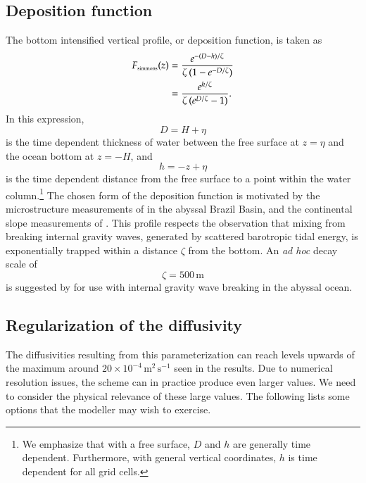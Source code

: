\subsection{Deposition function}

The bottom intensified vertical profile, or deposition function, is
taken as
\begin{equation}
\begin{split}
  F_{\mbox{\tiny simmons}}(z) &= \frac{e^{-(D-h)/\zeta}}{\zeta \, (1 - e^{-D/\zeta} )}
  \\
  &= \frac{e^{h/\zeta}}{\zeta \, (e^{D/\zeta}-1)}.
\end{split}
\label{eq:simmons-vertical-function}
\end{equation}
 In this expression,
\begin{equation}
  D = H + \eta
\end{equation}
is the time dependent thickness of water between the free surface at
$z=\eta$ and the ocean bottom at $z=-H$, and
\begin{equation}
  h=-z+\eta
\end{equation}
is the time dependent distance from the free surface to a point within
the water column.\footnote{We emphasize that with a free surface, $D$
and $h$ are generally time dependent.  Furthermore, with general
vertical coordinates, $h$ is time dependent for all grid cells.}  The
chosen form of the deposition function is motivated by the
microstructure measurements of \cite{StLaurent_etal2001} in the
abyssal Brazil Basin, and the continental slope measurements of
\cite{Moum_etal2002}.  This profile respects the observation that
mixing from breaking internal gravity waves, generated by scattered
barotropic tidal energy, is exponentially trapped within a distance
$\zeta$ from the bottom.  An {\em ad hoc} decay scale of
\begin{equation}
  \zeta = 500 \, \mbox{m}
\end{equation}
is suggested by \cite{Simmonsetal2004} for use with internal gravity
wave breaking in the abyssal ocean.


\subsection{Regularization of the diffusivity}

The diffusivities resulting from this parameterization can reach
levels upwards of the maximum around $20 \times 10^{-4} \,
\mbox{m}^{2} \, \mbox{s}^{-1}$ seen in the \cite{Polzinetal97}
results.  Due to numerical resolution issues, the scheme can in
practice produce even larger values.  We need to consider the physical
relevance of these large values.  The following lists some options
that the modeller may wish to exercise.

